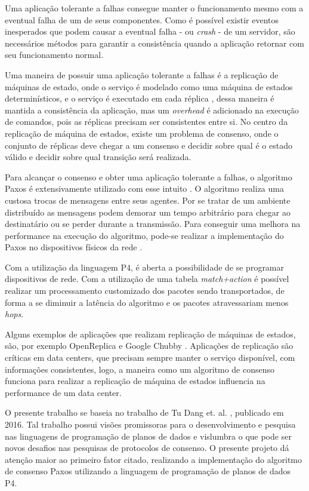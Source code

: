 \documentclass[12pt,
openright, 
oneside,
a4paper,
brazil]{facom-ufu-abntex2}
\theoremstyle{definition}
\begin{document}
Uma aplicação tolerante a falhas consegue manter o funcionamento mesmo com a eventual 
falha de um de seus componentes. Como é possível existir eventos inesperados que podem
causar a eventual falha - ou \textit{crash} - de um servidor, são necessários métodos
para garantir a consistência quando a aplicação retornar com seu funcionamento
normal. 

Uma maneira de possuir uma aplicação tolerante a falhas é a replicação de máquinas
de estado, onde o serviço é modelado como uma máquina de estados determinísticos, e o
serviço é executado em cada réplica \citep{santos2012state}, dessa maneira é mantida
a consistência da aplicação, mas um \textit{overhead} é adicionado na execução
de comandos, pois as réplicas precisam ser consistentes entre si. No centro da replicação
de máquina de estados, existe um problema de consenso, onde o conjunto de réplicas deve 
chegar a um consenso e decidir sobre qual é o estado válido e decidir sobre qual 
transição será realizada. 

Para alcançar o consenso e obter uma aplicação tolerante a falhas, o algoritmo
Paxos é extensivamente utilizado com esse intuito \citep{dang2016paxos}. 
O algoritmo realiza uma custosa trocas de mensagens entre seus agentes. Por se 
tratar de um ambiente distribuído as mensagens podem demorar um tempo arbitrário 
para chegar ao destinatário ou se perder durante a transmissão. Para conseguir 
uma melhora na performance na execução do algoritmo, pode-se realizar a 
implementação do Paxos no dispositivos físicos da rede \citep{dang2016paxos}.

Com a utilização da linguagem P4, é aberta a possibilidade de se programar dispositivos
de rede. Com a utilização de uma tabela \textit{match+action} é possível 
realizar um processamento customizado dos pacotes sendo transportados, de forma a
se diminuir a latência do algoritmo e os pacotes atravessariam menos \textit{hops}.

Alguns exemplos de aplicações que realizam replicação de máquinas de estados, são,
por exemplo OpenReplica \citep{openreplica} e Google Chubby \citep{27897}. Aplicações
de replicação são críticas em data centers, que precisam sempre manter o serviço 
disponível, com informações consistentes, logo, a maneira como um algoritmo de consenso
funciona para realizar a replicação de máquina de estados influencia na performance 
de um data center.

O presente trabalho se baseia no trabalho de Tu Dang et. al. \citep{dang2016paxos}, publicado
em 2016. Tal trabalho possui visões promissoras para o desenvolvimento
e pesquisa nas linguagens de programação de planos de dados e vislumbra o que pode ser
novos desafios nas pesquisas de protocolos de consenso. O presente projeto dá atenção maior
ao primeiro fator citado, realizando a implementação do algoritmo de consenso Paxos utilizando
a linguagem de programação de planos de dados P4.
\end{document}
